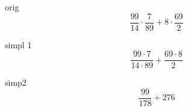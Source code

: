 \documentclass[a4paper, 12pt]{article}
\begin{document}
                          
orig \[ {{ \frac {99} {14} \cdot  \frac {7} {89}} + {8 \cdot  \frac {69} {2}}} \]

simpl 1 \[ { \frac {{99 \cdot 7}} {{14 \cdot 89}} +  \frac {{69 \cdot 8}} {2}} \]

simp2 \[ { \frac {99} {178} + 276} \]
\end{document}
